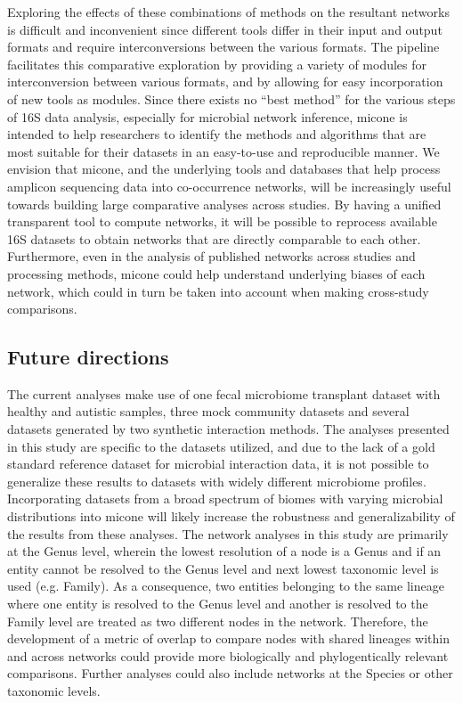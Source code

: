   Exploring the effects of these combinations of methods on the resultant networks is difficult and inconvenient since different tools differ in their input and output formats and require interconversions between the various formats.
  The pipeline facilitates this comparative exploration by providing a variety of modules for interconversion between various formats, and by allowing for easy incorporation of new tools as modules.
  Since there exists no ``best method'' for the various steps of 16S data analysis, especially for microbial network inference, \ac{micone} is intended to help researchers to identify the methods and algorithms that are most suitable for their datasets in an easy-to-use and reproducible manner.
  We envision that \ac{micone}, and the underlying tools and databases that help process amplicon sequencing data into co-occurrence networks, will be increasingly useful towards building large comparative analyses across studies.
  By having a unified transparent tool to compute networks, it will be possible to reprocess available 16S datasets to obtain networks that are directly comparable to each other.
  Furthermore, even in the analysis of published networks across studies and processing methods, \ac{micone} could help understand underlying biases of each network, which could in turn be taken into account when making cross-study comparisons.

  \subsection*{Future directions}

  The current analyses make use of one fecal microbiome transplant dataset with healthy and autistic samples, three mock community datasets and several datasets generated by two synthetic interaction methods.
  The analyses presented in this study are specific to the datasets utilized, and due to the lack of a gold standard reference dataset for microbial interaction data, it is not possible to generalize these results to datasets with widely different microbiome profiles.
  Incorporating datasets from a broad spectrum of biomes with varying microbial distributions into \ac{micone} will likely increase the robustness and generalizability of the results from these analyses.
  The network analyses in this study are primarily at the Genus level, wherein the lowest resolution of a node is a Genus and if an entity cannot be resolved to the Genus level and next lowest taxonomic level is used (e.g. Family).
  As a consequence, two entities belonging to the same lineage where one entity is resolved to the Genus level and another is resolved to the Family level are treated as two different nodes in the network.
  Therefore, the development of a metric of overlap to compare nodes with shared lineages within and across networks could provide more biologically and phylogentically relevant comparisons.
  Further analyses could also include networks at the Species or other taxonomic levels.

